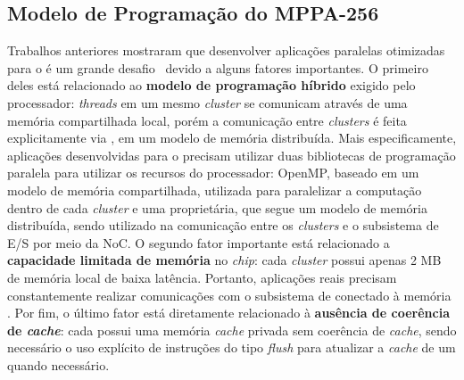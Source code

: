 \subsection{Modelo de Programação do MPPA-256}





Trabalhos anteriores mostraram que desenvolver aplicações paralelas otimizadas
para o \mppa é um grande desafio~\cite{Castro-IA3-JPDC:2014} devido a alguns
fatores importantes. O primeiro deles está relacionado ao \textbf{modelo de
    programação híbrido} exigido pelo processador: \textit{threads} em um mesmo
\textit{cluster} se comunicam através de uma memória compartilhada local, porém
a comunicação entre \textit{clusters} é feita explicitamente via \noc, em um
modelo de memória distribuída. Mais especificamente, aplicações desenvolvidas
para o \mppa precisam utilizar duas bibliotecas de programação paralela para
utilizar os recursos do processador: OpenMP, baseado em um modelo de memória
compartilhada, utilizada para paralelizar a computação dentro de cada
\textit{cluster} e uma \api proprietária, que segue um modelo de memória
distribuída, sendo utilizado na comunicação entre os \textit{clusters} e o
subsistema de E/S por meio da NoC. O segundo fator importante está relacionado a
\textbf{capacidade limitada de memória} no \textit{chip}: cada \textit{cluster}
possui apenas 2 MB de memória local de baixa latência. Portanto, aplicações
reais precisam constantemente realizar comunicações com o subsistema de \io
conectado à memória \lpddr. Por fim, o último fator está diretamente relacionado
à \textbf{ausência de coerência de \textit{cache}}: cada \pe possui uma memória
\textit{cache} privada sem coerência de \textit{cache}, sendo necessário o uso
explícito de instruções do tipo \textit{flush} para atualizar a \textit{cache}
de um \pe quando necessário.


